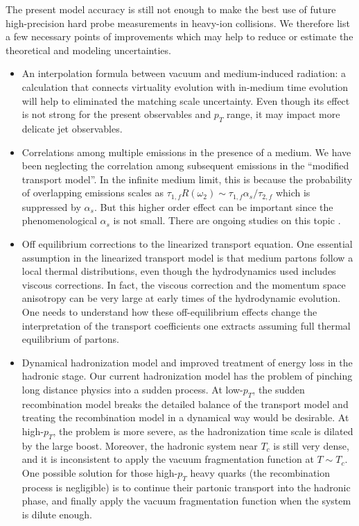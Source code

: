 The present model accuracy is still not enough to make the best use of future high-precision hard probe measurements in heavy-ion collisions.
We therefore list a few necessary points of improvements which may help to reduce or estimate the theoretical and modeling uncertainties.
\begin{itemize}
\item An interpolation formula between vacuum and medium-induced radiation: a calculation that connects virtuality evolution with in-medium time evolution will help to eliminated the matching scale uncertainty. Even though its effect is not strong for the present observables and $p_T$ range, it may impact more delicate jet observables.
\item Correlations among multiple emissions in the presence of a medium. We have been neglecting the correlation among subsequent emissions in the ``modified transport model''. In the infinite medium limit, this is because the probability of overlapping emissions scales as $\tau_{1,f} R(\omega_2) \sim \tau_{1,f} \alpha_s/\tau_{2,f}$ which is suppressed by $\alpha_s$. But this higher order effect can be important since the phenomenological $\alpha_s$ is not small. There are ongoing studies on this topic \cite{Arnold:2015qya,Arnold:2016kek,Arnold:2016mth,Arnold:2016jnq}.
\item Off equilibrium corrections to the linearized transport equation. One essential assumption in the linearized transport model is that medium partons follow a local thermal distributions, even though the hydrodynamics used includes viscous corrections. 
In fact, the viscous correction and the momentum space anisotropy can be very large at early times of the hydrodynamic evolution. 
One needs to understand how these off-equilibrium effects change the interpretation of the transport coefficients one extracts assuming full thermal equilibrium of partons.
\item Dynamical hadronization model and improved treatment of energy loss in the hadronic stage.
Our current hadronization model has the problem of pinching long distance physics into a sudden process. 
At low-$p_T$, the sudden recombination model breaks the detailed balance of the transport model and treating the recombination model in a dynamical way would be desirable.
At high-$p_T$, the problem is more severe, as the hadronization time scale is dilated by the large boost. 
Moreover, the hadronic system near $T_c$ is still very dense, and it is inconsistent to apply the vacuum fragmentation function at $T\sim T_c$.
One possible solution for those high-$p_T$ heavy quarks (the recombination process is negligible) is to continue their partonic transport into the hadronic phase, and finally apply the vacuum fragmentation function when the system is dilute enough.

\end{itemize}
